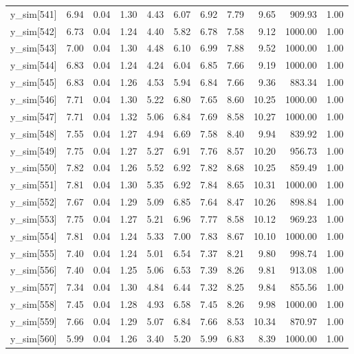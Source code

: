 \begin{table}[ht]
\begin{tabular}{rrrrrrrrrrr}
  y\_sim[541] & 6.94 & 0.04 & 1.30 & 4.43 & 6.07 & 6.92 & 7.79 & 9.65 & 909.93 & 1.00 \\ 
  y\_sim[542] & 6.73 & 0.04 & 1.24 & 4.40 & 5.82 & 6.78 & 7.58 & 9.12 & 1000.00 & 1.00 \\ 
  y\_sim[543] & 7.00 & 0.04 & 1.30 & 4.48 & 6.10 & 6.99 & 7.88 & 9.52 & 1000.00 & 1.00 \\ 
  y\_sim[544] & 6.83 & 0.04 & 1.24 & 4.24 & 6.04 & 6.85 & 7.66 & 9.19 & 1000.00 & 1.00 \\ 
  y\_sim[545] & 6.83 & 0.04 & 1.26 & 4.53 & 5.94 & 6.84 & 7.66 & 9.36 & 883.34 & 1.00 \\ 
  y\_sim[546] & 7.71 & 0.04 & 1.30 & 5.22 & 6.80 & 7.65 & 8.60 & 10.25 & 1000.00 & 1.00 \\ 
  y\_sim[547] & 7.71 & 0.04 & 1.32 & 5.06 & 6.84 & 7.69 & 8.58 & 10.27 & 1000.00 & 1.00 \\ 
  y\_sim[548] & 7.55 & 0.04 & 1.27 & 4.94 & 6.69 & 7.58 & 8.40 & 9.94 & 839.92 & 1.00 \\ 
  y\_sim[549] & 7.75 & 0.04 & 1.27 & 5.27 & 6.91 & 7.76 & 8.57 & 10.20 & 956.73 & 1.00 \\ 
  y\_sim[550] & 7.82 & 0.04 & 1.26 & 5.52 & 6.92 & 7.82 & 8.68 & 10.25 & 859.49 & 1.00 \\ 
  y\_sim[551] & 7.81 & 0.04 & 1.30 & 5.35 & 6.92 & 7.84 & 8.65 & 10.31 & 1000.00 & 1.00 \\ 
  y\_sim[552] & 7.67 & 0.04 & 1.29 & 5.09 & 6.85 & 7.64 & 8.47 & 10.26 & 898.84 & 1.00 \\ 
  y\_sim[553] & 7.75 & 0.04 & 1.27 & 5.21 & 6.96 & 7.77 & 8.58 & 10.12 & 969.23 & 1.00 \\ 
  y\_sim[554] & 7.81 & 0.04 & 1.24 & 5.33 & 7.00 & 7.83 & 8.67 & 10.10 & 1000.00 & 1.00 \\ 
  y\_sim[555] & 7.40 & 0.04 & 1.24 & 5.01 & 6.54 & 7.37 & 8.21 & 9.80 & 998.74 & 1.00 \\ 
  y\_sim[556] & 7.40 & 0.04 & 1.25 & 5.06 & 6.53 & 7.39 & 8.26 & 9.81 & 913.08 & 1.00 \\ 
  y\_sim[557] & 7.34 & 0.04 & 1.30 & 4.84 & 6.44 & 7.32 & 8.25 & 9.84 & 855.56 & 1.00 \\ 
  y\_sim[558] & 7.45 & 0.04 & 1.28 & 4.93 & 6.58 & 7.45 & 8.26 & 9.98 & 1000.00 & 1.00 \\ 
  y\_sim[559] & 7.66 & 0.04 & 1.29 & 5.07 & 6.84 & 7.66 & 8.53 & 10.34 & 870.97 & 1.00 \\ 
  y\_sim[560] & 5.99 & 0.04 & 1.26 & 3.40 & 5.20 & 5.99 & 6.83 & 8.39 & 1000.00 & 1.00 \\ 

\end{tabular}
\end{table}
